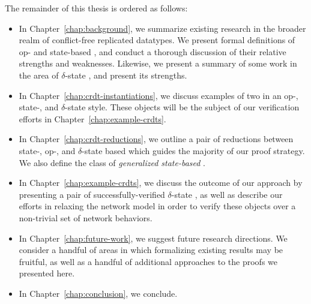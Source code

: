 The remainder of this thesis is ordered as follows:
\begin{itemize}
  \item In Chapter~\ref{chap:background}, we summarize existing research in the
    broader realm of conflict-free replicated datatypes. We present formal
    definitions of op- and state-based \CRDTs, and conduct a thorough discussion
    of their relative strengths and weaknesses. Likewise, we present a summary
    of some work in the area of $\delta$-state \CRDTs, and present its
    strengths.
  \item In Chapter~\ref{chap:crdt-instantiations}, we discuss examples of two
    \CRDTs in an op-, state-, and $\delta$-state style. These objects will be
    the subject of our verification efforts in Chapter~\ref{chap:example-crdts}.
  \item In Chapter~\ref{chap:crdt-reductions}, we outline a pair of reductions
    between state-, op-, and $\delta$-state based \CRDTs which guides the
    majority of our proof strategy. We also define the class of
    \emph{generalized state-based \CRDTs}.
  \item In Chapter~\ref{chap:example-crdts}, we discuss the outcome of our
    approach by presenting a pair of successfully-verified $\delta$-state
    \CRDTs, as well as describe our efforts in relaxing the network model in
    order to verify these objects over a non-trivial set of network behaviors.
  \item In Chapter~\ref{chap:future-work}, we suggest future
    research directions. We consider a handful of areas in which formalizing
    existing results may be fruitful, as well as a handful of additional
    approaches to the proofs we presented here.
  \item In Chapter~\ref{chap:conclusion}, we conclude.
\end{itemize}
